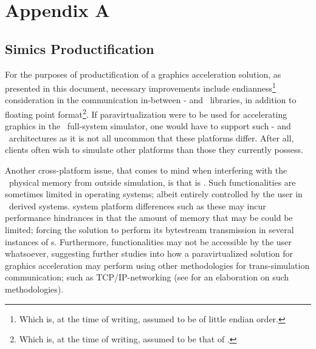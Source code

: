 
\chapter*{Appendix A}
\label{cha:appendixa}

\section*{Simics Productification}
\label{sec:appendixa_simicsproductification}
For the purposes of productification of a graphics acceleration solution, as presented in this document, necessary improvements include endianness\footnote{Which is, at the time of writing, assumed to be of little endian order.} consideration in the communication in-between \dvttermtarget - and \dvttermhost\ libraries, in addition to floating point format\footnote{Which is, at the time of writing, assumed to be that of \dvttermieeefp .}.
If paravirtualization were to be used for accelerating graphics in the \dvttermsimics\ full-system simulator, one would have to support such \dvttermtarget - and \dvttermhost\ architectures as it is not all uncommon that these platforms differ.
After all, clients often wish to simulate other platforms than those they currently possess.

Another cross-platform issue, that comes to mind when interfering with the \dvttermtarget\ physical memory from outside simulation, is that is .
Such functionalities are sometimes limited in operating systems; albeit entirely controlled by the user in \dvttermlinux\ derived systems.
 system platform differences such as these may incur performance hindrances in that the amount of memory that may be  could be limited; forcing the solution to perform its bytestream transmission in several instances of \dvttermmagicinstruction s.
Furthermore,  functionalities may not be accessible by the user whatsoever, suggesting further studies into how a paravirtualized solution for graphics acceleration may perform using other methodologies for trans-simulation communication; such as TCP/IP-networking (see  for an elaboration on such methodologies).

